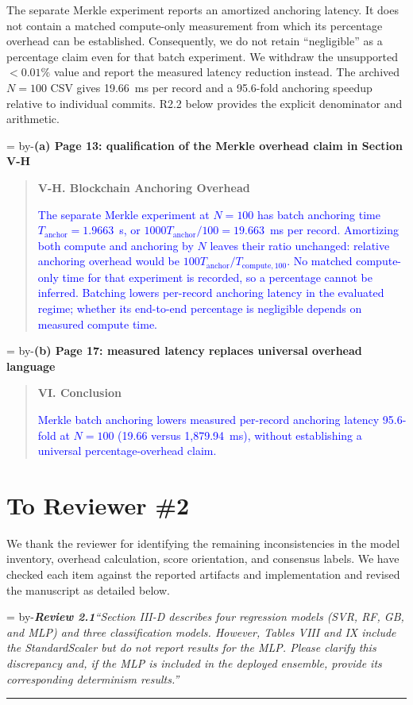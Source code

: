 \documentclass[11pt]{article}
\newenvironment{excerpt}{\begin{quote}\small\sloppy}{\end{quote}}
\newcommand{\roomfor}[1]{\par\begingroup\dimen0=\pagegoal\advance\dimen0 by-\pagetotal\ifdim\dimen0<#1\baselineskip\newpage\fi\endgroup}
\newcommand{\review}[2]{\roomfor{10}\bigskip\noindent\textbf{\textit{Review #1}}\quad\textit{``#2''}\par\smallskip\hrule\medskip}
\newcommand{\loc}[1]{\roomfor{7}\medskip\noindent\textbf{#1}\par\smallskip}
\newcommand{\mshead}[2]{\par\noindent\textbf{#1. #2}\par\smallskip}
\begin{document}
The separate Merkle experiment reports an amortized anchoring latency.
It does not contain a matched compute-only measurement from which its
percentage overhead can be established. Consequently, we do not retain
``negligible'' as a percentage claim even for that batch experiment. We
withdraw the unsupported $<0.01\%$ value and report the measured latency
reduction instead. The archived $N=100$ CSV gives 19.66~ms per record and
a 95.6-fold anchoring speedup relative to individual commits. R2.2 below
provides the explicit denominator and arithmetic.

\loc{(a) Page 13: qualification of the Merkle overhead claim in Section V-H}
\begin{excerpt}
\mshead{V-H}{Blockchain Anchoring Overhead}

\textcolor{blue}{The separate Merkle experiment at $N{=}100$
has batch anchoring time $T_{\mathrm{anchor}}=1.9663$~s,
or $1000T_{\mathrm{anchor}}/100=19.663$~ms per record.
Amortizing both compute and anchoring by $N$ leaves their
ratio unchanged: relative anchoring overhead would be
$100T_{\mathrm{anchor}}/T_{\mathrm{compute},100}$.
No matched compute-only time for that experiment is recorded,
so a percentage cannot be inferred. Batching lowers per-record anchoring
latency in the evaluated regime; whether its end-to-end
percentage is negligible depends on measured compute time.}
\end{excerpt}

\loc{(b) Page 17: measured latency replaces universal overhead language}
\begin{excerpt}
\mshead{VI}{Conclusion}

\textcolor{blue}{Merkle batch anchoring lowers measured
per-record anchoring latency 95.6-fold at $N{=}100$
(19.66 versus 1,879.94~ms), without establishing a universal
percentage-overhead claim.}
\end{excerpt}

\clearpage
\section*{To Reviewer \#2}
We thank the reviewer for identifying the remaining inconsistencies in the
model inventory, overhead calculation, score orientation, and consensus
labels. We have checked each item against the reported artifacts and
implementation and revised the manuscript as detailed below.

\review{2.1}{Section III-D describes four regression models (SVR, RF, GB, and MLP) and three classification models. However, Tables VIII and IX include the StandardScaler but do not report results for the MLP. Please clarify this discrepancy and, if the MLP is included in the deployed ensemble, provide its corresponding determinism results.}
\end{document}
